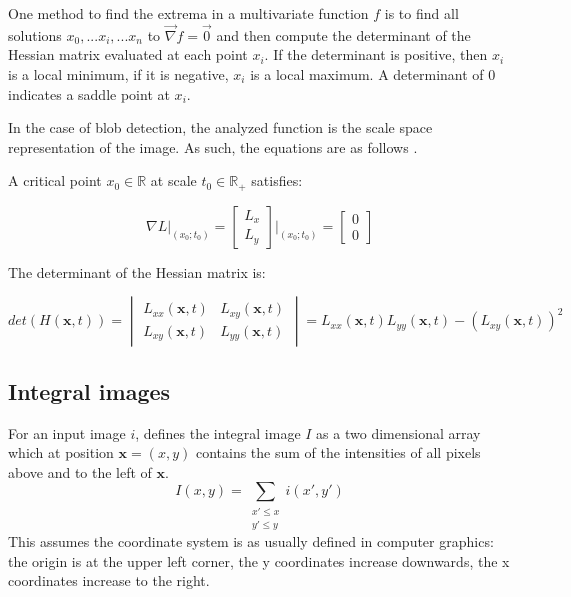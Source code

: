One method to find the extrema in a multivariate function $f$ is to find all solutions $x_0, ... x_i, ... x_n$ to $\vec\nabla f = \vec0$ and then compute the determinant of the Hessian matrix evaluated at each point $x_i$. If the determinant is positive, then $x_i$ is a local minimum, if it is negative, $x_i$ is a local maximum. A determinant of 0 indicates a saddle point at $x_i$.

In the case of blob detection, the analyzed function is the scale space representation of the image. As such, the equations are as follows \cite{Lindeberg93detectingsalient}.

A critical point $x_0 \in \mathbb{R}$ at scale $t_0 \in \mathbb{R}_+$ satisfies:

\begin{equation}
    \nabla L\rvert_{(x_0; t_0)} =
    \begin{bmatrix}
        L_{x} \\ L_{y}
    \end{bmatrix} \Bigg\rvert_{(x_0; t_0)} =
    \begin{bmatrix}
        0 \\ 0
    \end{bmatrix}
\end{equation}

The determinant of the Hessian matrix is:

\begin{equation}
    det(H(\mathbf{x},t)) =
    \begin{vmatrix}
        L_{xx}(\mathbf{x},t) & L_{xy}(\mathbf{x},t) \\
        L_{xy}(\mathbf{x},t) & L_{yy}(\mathbf{x},t)
    \end{vmatrix}
    =
    L_{xx}(\mathbf{x},t) L_{yy}(\mathbf{x},t) - (L_{xy}(\mathbf{x},t))^2
\end{equation}

\subsection{Integral images}

For an input image $i$, \cite{Viola01rapidobject} defines the integral image $I$ as a two dimensional array which at position $\mathbf{x} = (x,y)$ contains the sum of the intensities of all pixels above and to the left of $\mathbf{x}$.
\begin{equation}
I(x,y) = \sum_{\begin{smallmatrix} x' \le x \\ y' \le y\end{smallmatrix}} i(x',y')
\end{equation}
This assumes the coordinate system is as usually defined in computer graphics: the origin is at the upper left corner, the y coordinates increase downwards, the x coordinates increase to the right.

